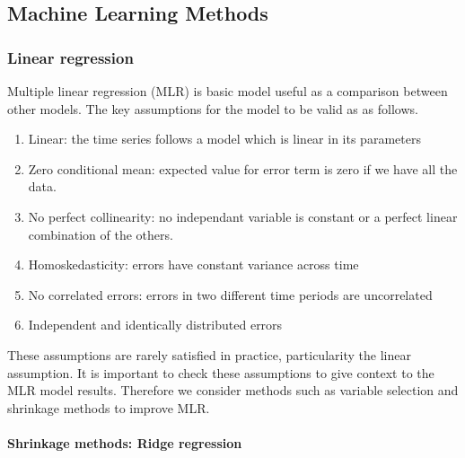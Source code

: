\documentclass[11pt]{article}
\begin{document}


\subsection{Machine Learning Methods}

\subsubsection{Linear regression}
\label{assumptions}

Multiple linear regression (MLR) is basic model useful as a comparison between other models. The key assumptions for the model to be valid as as follows.
\begin{enumerate}
\item Linear: the time series follows a model which is linear in its parameters 
\item Zero conditional mean: expected value for error term is zero if we have all the data.
\item No perfect collinearity: no independant variable is constant or a perfect linear combination of the others.
\item Homoskedasticity: errors have constant variance across time
\item No correlated errors: errors in two different time periods are uncorrelated
\item Independent and identically distributed errors
\end{enumerate}

\noindent These assumptions are rarely satisfied in practice, particularity the linear assumption. It is important to check these assumptions to give context to the MLR model results. Therefore we consider methods such as variable selection and shrinkage methods to improve MLR. 
\\
\\
\textbf{Shrinkage methods: Ridge regression}
\end{document}
